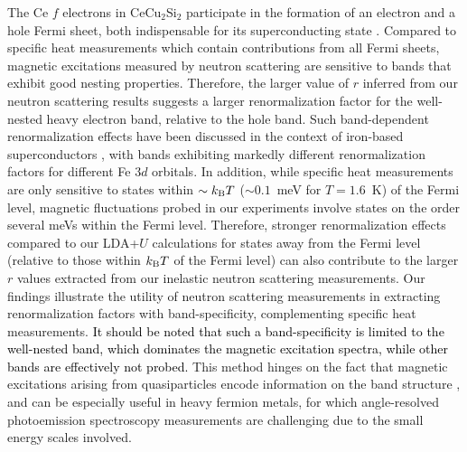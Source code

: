 \documentclass[aps,prl,onecolumn,amsmath,amssymb,superscriptaddress]{revtex4}
\newcommand{\ys}{\textcolor{black}}
\begin{document}
The Ce $f$ electrons in CeCu$_2$Si$_2$ participate in the formation of an electron and a hole Fermi sheet, both indispensable for its superconducting state \cite{YLi2018}. Compared to specific heat measurements which contain contributions from all Fermi sheets, magnetic excitations measured by neutron scattering are sensitive to bands that exhibit good nesting properties. Therefore, the larger value of $r$ inferred from our neutron scattering results suggests a larger renormalization factor for the well-nested heavy electron band, relative to the hole band. Such band-dependent renormalization effects have been discussed in the context of iron-based superconductors \cite{LdeMedici2014,MYi2017,Zhang14}, with bands exhibiting markedly different renormalization factors for different Fe $3d$ orbitals.
In addition, while specific heat measurements are only sensitive to states within $\sim k_{\rm B}T$ ($\sim0.1$~meV for $T=1.6$~K) of the Fermi level, magnetic fluctuations probed in our experiments involve states on the order several meVs within the Fermi level. Therefore, stronger renormalization effects compared to our LDA+$U$ calculations for states away from the Fermi level (relative to those within $k_{\rm B}T$ of the Fermi level) can also contribute to the larger $r$ values extracted from our inelastic neutron scattering measurements. 
Our findings illustrate the utility of neutron scattering measurements in extracting renormalization factors with band-specificity, complementing specific heat measurements. \ys{It should be noted that such a band-specificity is limited to the well-nested band, which dominates the magnetic excitation spectra, while other bands are effectively not probed.} This method hinges on the fact that magnetic excitations arising from quasiparticles encode information on the band structure \ys{\cite{EAGoremychkin2018,NPButch2015,PYPortnichenko2021}}, and can be especially useful in heavy fermion metals, for which angle-resolved photoemission spectroscopy measurements are challenging due to the small energy scales involved. 
\end{document}

